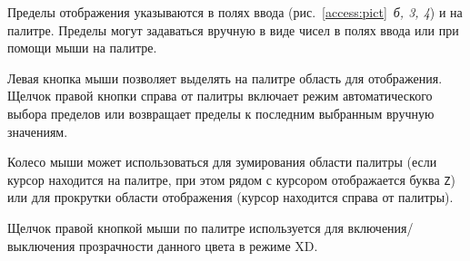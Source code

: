 \documentclass[12pt]{article}
\begin{document}
Пределы отображения указываются в полях ввода (рис.~\ref{access:pict}~{\it б, 3, 4}) и на палитре. Пределы могут задаваться
вручную в виде чисел в полях ввода или при помощи мыши на палитре.

Левая кнопка мыши позволяет выделять на палитре область для отображения.
Щелчок правой кнопки справа от палитры включает режим автоматического выбора пределов или возвращает пределы к последним выбранным вручную значениям.

Колесо мыши может использоваться для зумирования области палитры
(если курсор находится на палитре, при этом рядом с курсором отображается буква \verb'Z') или для прокрутки области отображения (курсор находится справа от палитры).

Щелчок правой кнопкой мыши по палитре используется для включения/выключения прозрачности данного цвета в режиме XD.
\end{document}
